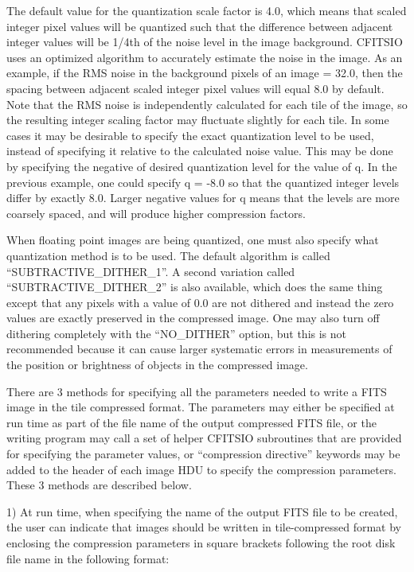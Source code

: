 \documentclass[11pt]{book}
\begin{document}
The default value for the quantization scale factor is 4.0, which means that
scaled integer pixel values will be quantized such that the difference
between adjacent integer values will be 1/4th of the noise level in the
image background. CFITSIO uses an optimized algorithm to accurately estimate
the noise in the image.  As an example, if the RMS noise in the background
pixels of an  image = 32.0,  then the spacing between adjacent scaled
integer pixel values  will equal 8.0 by default.  Note that the RMS noise is
independently calculated for each tile of the image, so the resulting
integer scaling factor may fluctuate slightly for each tile.   In some cases
it may be desirable to specify the exact quantization level to be used,
instead of specifying it relative to the calculated noise value.  This may
be done by specifying the negative of desired quantization level for the
value of q.  In the previous example, one could specify q = -8.0 so that the
quantized integer levels differ by exactly 8.0.  Larger negative values for q means
that the levels are more coarsely spaced, and will produce higher
compression factors.

When floating point images are being quantized, one must also specify what
quantization method is to be used.  The default algorithm is called
``SUBTRACTIVE\_DITHER\_1''.  A second variation called ``SUBTRACTIVE\_DITHER\_2''
is also available, which does the same thing except that any pixels with a
value of 0.0 are not dithered and instead the zero values are exactly
preserved in the compressed image.  One may also turn off dithering
completely with the ``NO\_DITHER'' option, but this is not recommended
because it can cause larger systematic errors in measurements of the
position or brightness of objects in the compressed image.

There are 3 methods for specifying all the parameters needed to write a FITS
image in the tile compressed format.  The parameters may either be specified
at run time as part of the file name of the output compressed FITS file, or
the writing program may call a set of helper CFITSIO subroutines that are provided
for specifying the parameter values, or ``compression directive'' keywords
may be added to the header of each image HDU to specify the compression parameters.
These 3 methods are described below.

1)  At run time, when specifying the name of the output FITS file to be
created, the user can indicate that images should be
written in tile-compressed format by enclosing the compression
parameters in square brackets following the root disk file name
in the following format:
\end{document}
